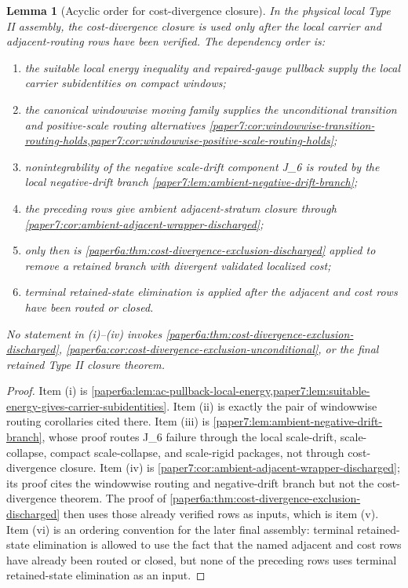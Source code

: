 \documentclass[11pt]{amsart}
\def\({}%
\def\){}%
\theoremstyle{plain}
\newtheorem{lemma}[lemma]{Lemma}
\theoremstyle{definition}
\theoremstyle{remark}
\begin{document}
\begin{lemma}[Acyclic order for cost-divergence closure]
\label{paper6a:lem:cost-divergence-closure-order}
In the physical local Type II assembly, the cost-divergence closure is used only
after the local carrier and adjacent-routing rows have been verified.  The
dependency order is:
\begin{enumerate}[label=\textup{(\roman*)}]
\item the suitable local energy inequality and repaired-gauge pullback supply the
local carrier subidentities on compact windows;
\item the canonical windowwise moving family supplies the unconditional
transition and positive-scale routing alternatives
\cref{paper7:cor:windowwise-transition-routing-holds,paper7:cor:windowwise-positive-scale-routing-holds};
\item nonintegrability of the negative scale-drift component \(J_6\) is routed
by the local negative-drift branch
\cref{paper7:lem:ambient-negative-drift-branch};
\item the preceding rows give ambient adjacent-stratum closure through
\cref{paper7:cor:ambient-adjacent-wrapper-discharged};
\item only then is
\cref{paper6a:thm:cost-divergence-exclusion-discharged} applied to remove a
retained branch with divergent validated localized cost;
\item terminal retained-state elimination is applied after the adjacent and cost
rows have been routed or closed.
\end{enumerate}
No statement in \textup{(i)}--\textup{(iv)} invokes
\cref{paper6a:thm:cost-divergence-exclusion-discharged},
\cref{paper6a:cor:cost-divergence-exclusion-unconditional}, or the final
retained Type II closure theorem.
\end{lemma}

\begin{proof}
Item \textup{(i)} is
\cref{paper6a:lem:ac-pullback-local-energy,paper7:lem:suitable-energy-gives-carrier-subidentities}.
Item \textup{(ii)} is exactly the pair of windowwise routing corollaries cited
there.  Item \textup{(iii)} is
\cref{paper7:lem:ambient-negative-drift-branch}, whose proof routes \(J_6\)
failure through the local scale-drift, scale-collapse, compact
scale-collapse, and scale-rigid packages, not through cost-divergence closure.
Item \textup{(iv)} is
\cref{paper7:cor:ambient-adjacent-wrapper-discharged}; its proof cites the
windowwise routing and negative-drift branch but not the cost-divergence theorem.
The proof of
\cref{paper6a:thm:cost-divergence-exclusion-discharged} then uses those already
verified rows as inputs, which is item \textup{(v)}.  Item \textup{(vi)} is an
ordering convention for the later final assembly: terminal retained-state
elimination is allowed to use the fact that the named adjacent and cost rows
have already been routed or closed, but none of the preceding rows uses terminal
retained-state elimination as an input.
\end{proof}
\end{document}
